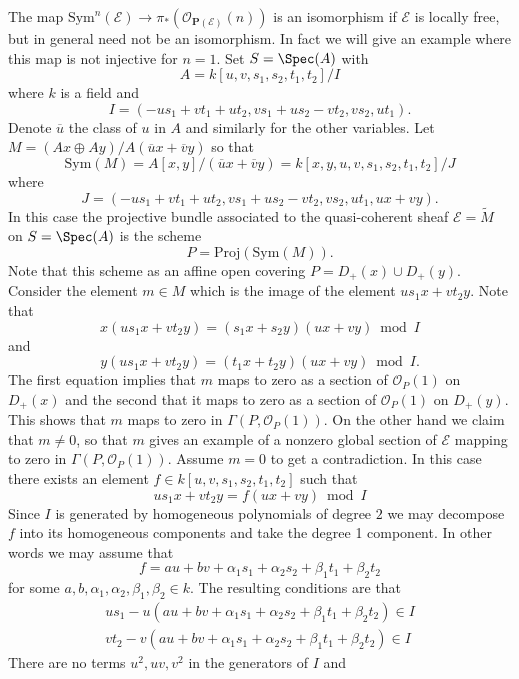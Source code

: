 \begin{example}
\label{example-projective-bundle}
The map $\text{Sym}^n(\mathcal{E}) \to
\pi_*(\mathcal{O}_{\mathbf{P}(\mathcal{E})}(n))$
is an isomorphism if $\mathcal{E}$ is locally free, but in general
need not be an isomorphism. In fact we will give an example where
this map is not injective for $n = 1$. Set $S = \Spec(A)$ with
$$
A = k[u, v, s_1, s_2, t_1, t_2]/I
$$
where $k$ is a field and
$$
I = (-us_1 + vt_1 + ut_2, vs_1 + us_2 - vt_2, vs_2, ut_1).
$$
Denote $\overline{u}$ the class of $u$ in $A$ and similarly for
the other variables.
Let $M = (Ax \oplus Ay)/A(\overline{u}x + \overline{v}y)$ so that
$$
\text{Sym}(M) = A[x, y]/(\overline{u}x + \overline{v}y)
= k[x, y, u, v, s_1, s_2, t_1, t_2]/J
$$
where
$$
J = (-us_1 + vt_1 + ut_2, vs_1 + us_2 - vt_2, vs_2, ut_1, ux + vy).
$$
In this case the projective bundle associated to the quasi-coherent
sheaf $\mathcal{E} = \widetilde{M}$ on $S = \Spec(A)$ is the scheme
$$
P =
\text{Proj}(\text{Sym}(M)).
$$
Note that this scheme as an affine open covering
$P = D_{+}(x) \cup D_{+}(y)$.
Consider the element
$m \in M$ which is the image of the element
$us_1x + vt_2y$. Note that
$$
x(us_1x + vt_2y) = (s_1x + s_2y)(ux + vy) \bmod I
$$
and
$$
y(us_1x + vt_2y) = (t_1x + t_2y)(ux + vy) \bmod I.
$$
The first equation implies that $m$ maps to zero as a
section of $\mathcal{O}_P(1)$ on $D_{+}(x)$ and the second
that it maps to zero as a section of $\mathcal{O}_P(1)$ on $D_{+}(y)$.
This shows that $m$ maps to zero in $\Gamma(P, \mathcal{O}_P(1))$.
On the other hand we claim that $m \not = 0$, so that $m$ gives
an example of a nonzero global section of $\mathcal{E}$ mapping to zero
in $\Gamma(P, \mathcal{O}_P(1))$. Assume $m = 0$
to get a contradiction. In this case there exists
an element $f \in k[u, v, s_1, s_2, t_1, t_2]$ such that
$$
us_1x + vt_2y = f(ux + vy) \bmod I
$$
Since $I$ is generated by homogeneous polynomials of degree $2$ we
may decompose $f$ into its homogeneous components and take the
degree 1 component. In other words we may assume that
$$
f = au + bv + \alpha_1s_1 + \alpha_2s_2 + \beta_1t_1 + \beta_2t_2
$$
for some $a, b, \alpha_1, \alpha_2, \beta_1, \beta_2 \in k$.
The resulting conditions are that
$$
\begin{matrix}
us_1 - u(au + bv + \alpha_1s_1 + \alpha_2s_2 + \beta_1t_1 + \beta_2t_2)
\in I \\
vt_2 - v(au + bv + \alpha_1s_1 + \alpha_2s_2 + \beta_1t_1 + \beta_2t_2)
\in I
\end{matrix}
$$
There are no terms $u^2, uv, v^2$ in the generators of $I$ and

\end{example}
